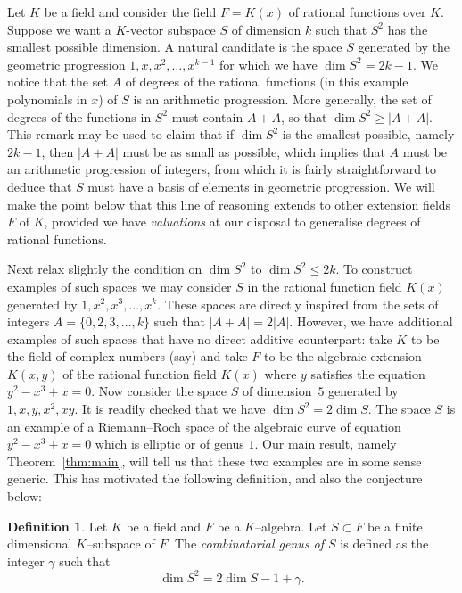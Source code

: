 \documentclass[10pt]{amsart}
\theoremstyle{definition}
\newtheorem{defi}[theo]{Definition}
\theoremstyle{remark}
\renewcommand{\geq}{\geqslant}
\renewcommand{\leq}{\leqslant}
\begin{document}
Let $K$ be a field and consider the field $F=K(x)$ of rational functions over $K$. Suppose we want a $K$-vector subspace $S$ of dimension $k$ such that $S^2$ has the smallest possible dimension. A natural candidate is the space $S$ generated by the geometric progression $1,x,x^2,\ldots,x^{k-1}$ for which we have $\dim S^2=2k-1$. We notice that the set $A$ of degrees of the rational functions (in this example polynomials in $x$) of $S$ is an arithmetic progression. More generally, the set of degrees of the functions in $S^2$ must contain $A+A$, so that $\dim S^2\geq|A+A|$. This remark may be used to claim that if $\dim S^2$ is the smallest possible, namely $2k-1$, then $|A+A|$ must be as small as possible, which implies that $A$ must be an arithmetic progression of integers, from which it is fairly straightforward to deduce that $S$ must have a basis of elements in geometric progression. We will make the point below that this line of reasoning extends to other extension fields $F$ of $K$, provided we have \emph{valuations} at our disposal to generalise degrees of rational functions.

Next relax slightly the condition on $\dim S^2$ to $\dim S^2\leq2k$. To construct examples of such spaces we may consider $S$ in the rational function field $K(x)$ generated by $1,x^2,x^3,\ldots,x^k$. These spaces are directly inspired from the sets of integers $A=\{0,2,3,\ldots,k\}$ such that $|A+A|=2|A|$. However, we have additional examples of such spaces that have no direct additive counterpart: take $K$ to be the field of complex numbers (say) and take $F$ to be the algebraic extension $K(x,y)$ of the rational function field $K(x)$ where $y$ satisfies the equation $y^2-x^3+x=0$. Now consider the space $S$ of dimension~$5$ generated by $1,x,y,x^2,xy$. It is readily checked that we have $\dim S^2=2\dim S$. The space $S$ is an example of a Riemann--Roch space of the algebraic curve of equation $y^2-x^3+x=0$ which is elliptic or of genus $1$. Our main result, namely Theorem~\ref{thm:main}, will tell us that these two examples are in some sense generic. This has motivated the following definition, and also the conjecture below:

\begin{defi}\label{def:gamma}
Let $K$ be a field and $F$ be a $K$--algebra. Let $S \subset F$ be a finite dimensional $K$--subspace of $F$. The \emph{combinatorial genus of $S$} is defined as the integer $\gamma$ such that
\[
\dim S^2=2\dim S - 1 + \gamma.
\]
\end{defi}
\end{document}
